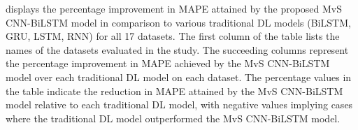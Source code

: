 \documentclass[a4paper, fleqn]{cas-sc}
\theoremstyle{definition}
\theoremstyle{remark}
\begin{document}
     displays the percentage improvement in MAPE attained by the proposed MvS CNN-BiLSTM model in comparison to various traditional DL models (BiLSTM,  GRU,  LSTM,  RNN) for all 17 datasets. The first column of the table lists the names of the datasets evaluated in the study. The succeeding columns represent the percentage improvement in MAPE achieved by the MvS CNN-BiLSTM model over each traditional DL model on each dataset. The percentage values in the table indicate the reduction in MAPE attained by the MvS CNN-BiLSTM model relative to each traditional DL model,  with negative values implying cases where the traditional DL model outperformed the MvS CNN-BiLSTM model.

\end{document}
